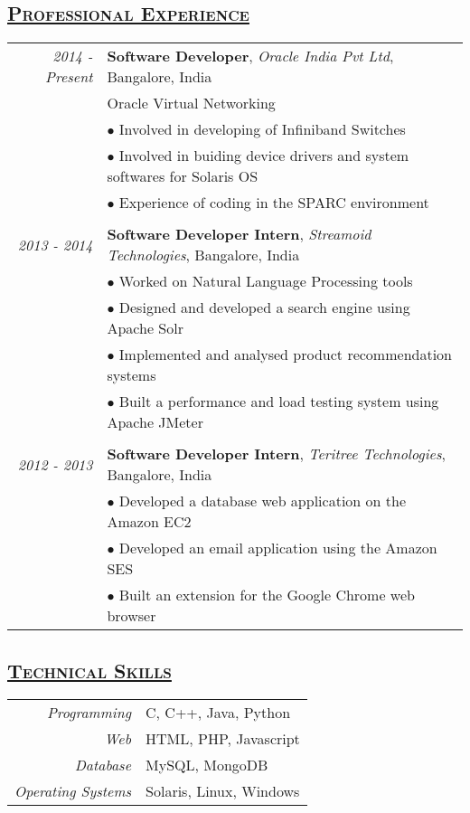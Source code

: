 \documentclass[14pt]{article}
\begin{document}
\subsection* {\scshape\LARGE\uline {Professional Experience}}
\large
\begin{tabularx}{\textwidth}{r X}
\emph{2014 - Present} & \textbf{Software Developer}, \textit{Oracle India Pvt Ltd}, Bangalore, India \\
		                      & Oracle Virtual Networking\\ 
			                & $\bullet$ Involved in developing of Infiniband Switches\\
			                & $\bullet$ Involved in buiding device drivers and system softwares for  Solaris OS\\
			                & $\bullet$ Experience of coding in the SPARC environment	    
\\ \\

\emph{2013 - 2014} & \textbf{Software Developer Intern}, \textit{Streamoid Technologies}, Bangalore, India \\ 
			            & $\bullet$ Worked on Natural Language Processing tools \\
		 	            & $\bullet$ Designed and developed a search engine using Apache Solr \\
   			            & $\bullet$ Implemented and analysed product recommendation systems \\
			            & $\bullet$ Built a performance and load testing system using Apache JMeter
\\ \\

\emph{2012 - 2013} & \textbf{Software Developer Intern}, \textit{Teritree Technologies}, Bangalore, India \\ 
			            & $\bullet$ Developed a database web application on the Amazon EC2 \\
			            & $\bullet$ Developed an email application using the Amazon SES\\
			            & $\bullet$ Built an extension for the Google Chrome web browser	    
\end{tabularx}

\subsection* {\scshape\LARGE\uline {Technical Skills}}
\begin{tabular}{r l}
\emph{Programming} & C, C++, Java, Python \\
\emph{Web}              & HTML, PHP, Javascript \\
\emph{Database}	  & MySQL, MongoDB \\
\emph{Operating Systems} & Solaris, Linux, Windows
\end{tabular}
\end{document}
